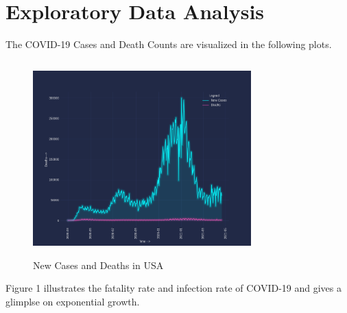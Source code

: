 \documentclass[12pt,a4paper]{article}
\begin{document}
\section*{Exploratory Data Analysis}
The COVID-19 Cases and Death Counts are visualized in the following plots.
\begin{figure}[H]
    \centering
    \includegraphics[width=0.75\textwidth,height=75mm]{images/usa/deaths and cases.png}
    \caption{New Cases and Deaths in USA}
\end{figure}


Figure 1 illustrates the fatality rate and infection rate of COVID-19
and gives a glimplse on exponential growth.
\end{document}

